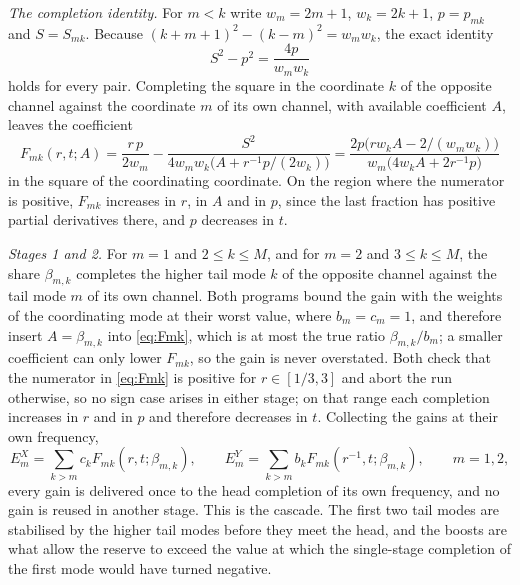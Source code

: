 \documentclass[10pt]{article}
\theoremstyle{remark}
\begin{document}
\emph{The completion identity.} For $m<k$ write $w_m=2m+1$, $w_k=2k+1$, $p=p_{mk}$ and $S=S_{mk}$. Because $(k+m+1)^2-(k-m)^2=w_mw_k$, the exact identity
\begin{equation}\label{eq:idm}
S^2-p^2=\frac{4p}{w_mw_k}
\end{equation}
holds for every pair. Completing the square in the coordinate $k$ of the opposite channel against the coordinate $m$ of its own channel, with available coefficient $A$, leaves the coefficient
\begin{equation}\label{eq:Fmk}
F_{mk}(r,t;A)=\frac{r\,p}{2w_m}-\frac{S^2}{4w_mw_k\bigl(A+r^{-1}p/(2w_k)\bigr)}
=\frac{2p\bigl(rw_kA-2/(w_mw_k)\bigr)}{w_m\bigl(4w_kA+2r^{-1}p\bigr)}
\end{equation}
in the square of the coordinating coordinate. On the region where the numerator is positive, $F_{mk}$ increases in $r$, in $A$ and in $p$, since the last fraction has positive partial derivatives there, and $p$ decreases in $t$.

\emph{Stages 1 and 2.} For $m=1$ and $2\le k\le M$, and for $m=2$ and $3\le k\le M$, the share $\beta_{m,k}$ completes the higher tail mode $k$ of the opposite channel against the tail mode $m$ of its own channel. Both programs bound the gain with the weights of the coordinating mode at their worst value, where $b_m=c_m=1$, and therefore insert $A=\beta_{m,k}$ into \eqref{eq:Fmk}, which is at most the true ratio $\beta_{m,k}/b_m$; a smaller coefficient can only lower $F_{mk}$, so the gain is never overstated. Both check that the numerator in \eqref{eq:Fmk} is positive for $r\in[1/3,3]$ and abort the run otherwise, so no sign case arises in either stage; on that range each completion increases in $r$ and in $p$ and therefore decreases in $t$. Collecting the gains at their own frequency,
\[
E^{X}_{m}=\sum_{k>m}c_kF_{mk}(r,t;\beta_{m,k}),\qquad
E^{Y}_{m}=\sum_{k>m}b_kF_{mk}(r^{-1},t;\beta_{m,k}),\qquad m=1,2,
\]
every gain is delivered once to the head completion of its own frequency, and no gain is reused in another stage. This is the cascade. The first two tail modes are stabilised by the higher tail modes before they meet the head, and the boosts are what allow the reserve to exceed the value at which the single-stage completion of the first mode would have turned negative.
\end{document}
